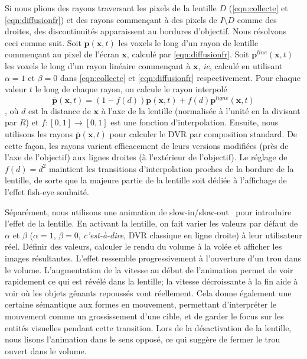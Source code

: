 Si nous plions des rayons traversant les pixels de la lentille $ D $ (\autoref{eqn:collecte} et \autoref{eqn:diffusionfr}) et des rayons commençant à des pixels de $ I \setminus D $ comme des droites, des discontinuités apparaissent au bordures d'objectif. Nous résolvons ceci comme suit. Soit $ \mathbf{p}(\mathbf{x}, t) $ les voxels le long d'un rayon de lentille commençant au pixel de l'écran $ \mathbf{x} $, calculé par \autoref{eqn:diffusionfr}. Soit $ \mathbf{p}^{line}(\mathbf{x}, t) $ les voxels le long d'un rayon linéaire commençant à $ \mathbf{x} $, \emph{ie}, calculé en utilisant $ \alpha = 1 $ et $ \beta = 0 $ dans \autoref{eqn:collecte} et \autoref{eqn:diffusionfr} respectivement. Pour chaque valeur $ t $ le long de chaque rayon, on calcule le rayon interpolé
\begin{equation}
\bar{\mathbf{p}}(\mathbf{x}, t) = (1-f(d)) \mathbf{p}(\mathbf{x}, t) + f(d) \mathbf{p}^{ligne}(\mathbf{x}, t)
\end{equation},
 où $ d $ est la distance de $ \mathbf{x} $ à l'axe de la lentille (normalisée à l'unité en la divisant par $ R $) et $ f: [0,1] \rightarrow [0,1] $ est une fonction d'interpolation. Ensuite, nous utilisons les rayons $ \bar{\mathbf{p}}(\mathbf{x}, t) $ pour calculer le DVR par composition standard. De cette façon, les rayons varient efficacement de leurs versions modifiées (près de l'axe de l'objectif) aux lignes droites (à l'extérieur de l'objectif). Le réglage de $ f(d) = d^2 $ maintient les transitions d'interpolation proches de la bordure de la lentille, de sorte que la majeure partie de la lentille soit dédiée à l'affichage de l'effet fish-eye souhaité.

Séparément, nous utilisons une animation de slow-in/slow-out \, \cite{Dragicevic:2011:TDA:1978942.1979233} pour introduire l'effet de la lentille. En activant la lentille, on fait varier les valeurs par défaut de $ \alpha $ et $ \beta $ ($ \alpha = 1 $, $ \beta = 0 $, \emph{c'est-à-dire}, DVR classique en ligne droite) à leur utilisateur réel. Définir des valeurs, calculer le rendu du volume à la volée et afficher les images résultantes. L'effet ressemble progressivement à l'ouverture d'un trou dans le volume. L'augmentation de la vitesse au début de l'animation permet de voir rapidement ce qui est révélé dans la lentille; la vitesse décroissante à la fin aide à voir où les objets gênants repoussés vont réellement. Cela donne également une certaine sémantique aux formes en mouvement, permettant d'interpréter le mouvement comme un grossissement d'une cible, et de garder le focus sur les entités visuelles pendant cette transition. Lors de la désactivation de la lentille, nous lisons l'animation dans le sens opposé, ce qui suggère de fermer le trou ouvert dans le volume.


